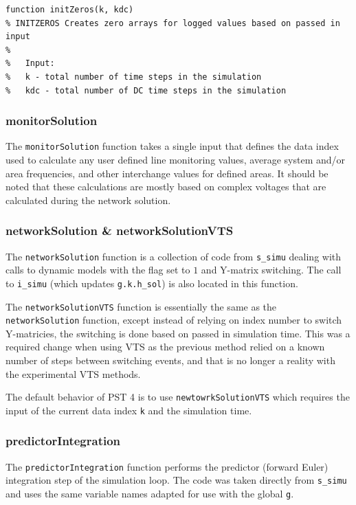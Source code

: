 \begin{verbatim}
function initZeros(k, kdc)
% INITZEROS Creates zero arrays for logged values based on passed in input
%
%   Input:
%   k - total number of time steps in the simulation
%   kdc - total number of DC time steps in the simulation
\end{verbatim}

\subsubsection{monitorSolution}  
The \verb|monitorSolution| function takes a single input that defines the data index used to calculate any user defined line monitoring values, average system and/or area frequencies, and other interchange values for defined areas.
It should be noted that these calculations are mostly based on complex voltages that are calculated during the network solution.

\subsubsection{networkSolution \& networkSolutionVTS}  
The \verb|networkSolution| function is a collection of code from \verb|s_simu| dealing with calls to dynamic models with the flag set to $1$ and Y-matrix switching.
The call to \verb|i_simu| (which updates \verb|g.k.h_sol|) is also located in this function.

The \verb|networkSolutionVTS| function is essentially the same as the \verb|networkSolution| function, except instead of relying on index number to switch Y-matricies, the switching is done based on passed in simulation time.
This was a required change when using VTS as the previous method relied on a known number of steps between switching events, and that is no longer a reality with the experimental VTS methods.

The default behavior of PST 4 is to use \verb|newtowrkSolutionVTS| which requires the input of the current data index \verb|k| and the simulation time.

\subsubsection{predictorIntegration}  
The \verb|predictorIntegration| function performs the predictor (forward Euler) integration step of the simulation loop.
The code was taken directly from \verb|s_simu| and uses the same variable names adapted for use with the global \verb|g|.

